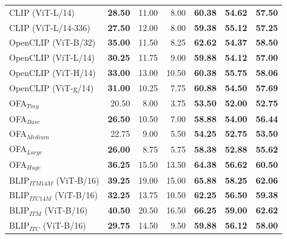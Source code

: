 \begin{table}[ht]
\begin{adjustbox}{max width=0.6\textwidth}
\begin{tabular}{l|rrr|rrr}
 CLIP (ViT-L/14)                     & \textbf{28.50} & 11.00          & 8.00           & \textbf{60.38} & \textbf{54.62} & \textbf{57.50} \\
 CLIP (ViT-L/14-336)                 & \textbf{27.50} & 12.00          & 8.00           & \textbf{59.38} & \textbf{55.12} & \textbf{57.25} \\
 OpenCLIP (ViT-B/32)            & \textbf{35.00} & 11.50          & 8.25           & \textbf{62.62} & \textbf{54.37} & \textbf{58.50} \\
 OpenCLIP (ViT-L/14)            & \textbf{30.25} & 11.75          & 9.00           & \textbf{59.88} & \textbf{54.12} & \textbf{57.00} \\
 OpenCLIP (ViT-H/14)            & \textbf{33.00} & 13.00          & 10.50          & \textbf{60.38} & \textbf{55.75} & \textbf{58.06} \\
 OpenCLIP (ViT-g/14)            & \textbf{31.00} & 10.25          & 7.75           & \textbf{60.88} & \textbf{54.50} & \textbf{57.69} \\
 OFA$_{Tiny}$                        & 20.50          & 8.00           & 3.75           & \textbf{53.50} & \textbf{52.00} & \textbf{52.75} \\
 OFA$_{Base}$                        & \textbf{26.50} & 10.50          & 7.00           & \textbf{58.88} & \textbf{54.00} & \textbf{56.44} \\
 OFA$_{Medium}$                      & 22.75          & 9.00           & 5.50           & \textbf{54.25} & \textbf{52.75} & \textbf{53.50} \\
 OFA$_{Large}$                       & \textbf{26.00} & 8.75           & 5.75           & \textbf{58.38} & \textbf{52.88} & \textbf{55.62} \\
 OFA$_{Huge}$                        & \textbf{36.25} & 15.50          & 13.50          & \textbf{64.38} & \textbf{56.62} & \textbf{60.50} \\
 BLIP$_{ITM 14M}$ (ViT-B/16)         & \textbf{39.25} & 19.00          & 15.00          & \textbf{65.88} & \textbf{58.25} & \textbf{62.06} \\
 BLIP$_{ITC 14M}$ (ViT-B/16)         & \textbf{32.25} & 13.75          & 10.50          & \textbf{62.25} & \textbf{56.50} & \textbf{59.38} \\
 BLIP$_{ITM}$ (ViT-B/16)             & \textbf{40.50} & 20.50          & 16.50          & \textbf{66.25} & \textbf{59.00} & \textbf{62.62} \\
 BLIP$_{ITC}$ (ViT-B/16)             & \textbf{29.75} & 14.50          & 9.50           & \textbf{59.88} & \textbf{56.12} & \textbf{58.00} \\

\end{tabular}
\end{adjustbox}
\end{table}
